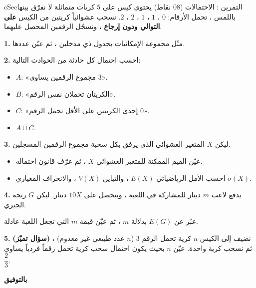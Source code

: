 \documentclass[12pt,a4paper]{article}
\newenvironment{BOX}[2]{\begin{otherlanguage}{english}\begin{arbox}{#1}{#2}}{\end{arbox}\end{otherlanguage}}
\newcounter{exo}
\newenvironment{tamrin}[1]{\stepcounter{exo}\begin{BOX}{cSec}{التمرين \theexo: #1}}{\end{BOX}}
\newenvironment{sq}{\begin{itemize}[leftmargin=2.4em,itemsep=3pt]}{\end{itemize}}
\newcommand{\qa}{\item[(أ)]}\newcommand{\qb}{\item[(ب)]}\newcommand{\qc}{\item[(جـ)]}\newcommand{\qd}{\item[(د)]}\newcommand{\qe}{\item[(هـ)]}
\newcommand{\QQ}[1]{\par\smallskip\textbf{#1.} }
\begin{document}
\begin{tamrin}{الاحتمالات (08 نقاط)}
يحتوي كيس على $5$ كريات متماثلة لا نفرّق بينها باللمس ، تحمل الأرقام: $0$ ، $1$ ، $1$ ، $2$ ، $2$.
نسحب عشوائياً كريتين من الكيس \textbf{على التوالي ودون إرجاع} ، ونسجّل الرقمين المحصل عليهما.
\QQ{1} مثّل مجموعة الإمكانيات بجدول ذي مدخلين ، ثم عيّن عددها.
\QQ{2} احسب احتمال كل حادثة من الحوادث التالية:
\begin{sq}
\qa $A$: «مجموع الرقمين يساوي $3$».
\qb $B$: «الكريتان تحملان نفس الرقم».
\qc $C$: «إحدى الكريتين على الأقل تحمل الرقم $0$».
\qd $A\cup C$.
\end{sq}
\QQ{3} ليكن $X$ المتغير العشوائي الذي يرفق بكل سحبة مجموع الرقمين المسجلين.
\begin{sq}
\qa عيّن القيم الممكنة للمتغير العشوائي $X$ ، ثم عرّف قانون احتماله.
\qb احسب الأمل الرياضياتي $E(X)$ ، والتباين $V(X)$ ، والانحراف المعياري $\sigma(X)$.
\end{sq}
\QQ{4} يدفع لاعب $m$ دينار للمشاركة في اللعبة ، ويتحصل على $10X$ دينار. ليكن $G$ ربحه الجبري.
\par عبّر عن $E(G)$ بدلالة $m$ ، ثم عيّن قيمة $m$ التي تجعل اللعبة عادلة.
\QQ{5} \textbf{(سؤال تميّز)} نضيف إلى الكيس $n$ كرية تحمل الرقم $3$ ($n$ عدد طبيعي غير معدوم) ، ثم نسحب كرية واحدة. عيّن $n$ بحيث يكون احتمال سحب كرية تحمل رقماً فردياً يساوي $\dfrac23$.
\end{tamrin}
\begin{center}\textbf{\color{cSec}بالتوفيق}\end{center}
\end{document}
